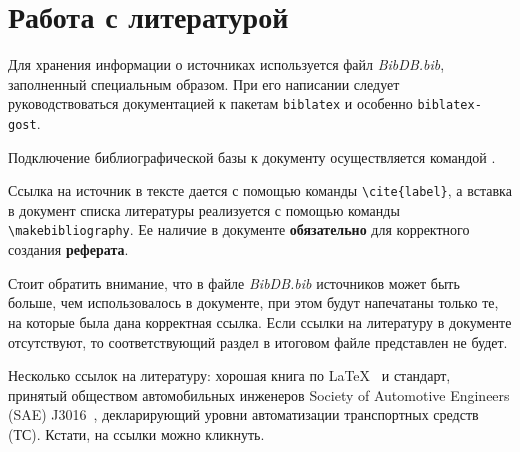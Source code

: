 \section{Работа с литературой}

Для хранения информации о источниках используется файл \textit{BibDB.bib},
заполненный специальным образом. При его написании следует руководствоваться
документацией к пакетам \lstinline:biblatex: и особенно
\lstinline:biblatex-gost:.  

Подключение библиографической базы к документу осуществляется командой
\lstinline::. 

Ссылка на источник в тексте дается с помощью команды \lstinline:\cite{label}:, а
вставка в документ списка литературы реализуется с помощью команды
\lstinline:\makebibliography:. Ее наличие в документе \textbf{обязательно} для
корректного создания \textbf{реферата}.

Стоит обратить внимание, что в файле \textit{BibDB.bib} источников может быть
больше, чем использовалось в документе, при этом будут напечатаны только те, на
которые была дана корректная ссылка. Если ссылки на литературу в документе
отсутствуют, то соответствующий раздел в итоговом файле представлен не будет.

Несколько ссылок на литературу: хорошая книга по \LaTeX~\cite{book:Lvov} и
стандарт, принятый обществом автомобильных инженеров Society of Automotive
Engineers (SAE) J3016~\cite{url:SAE_J3016}, декларирующий уровни автоматизации
транспортных средств (ТС). Кстати, на ссылки можно кликнуть.